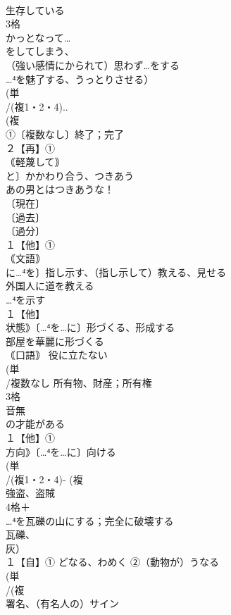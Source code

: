 \documentclass[8pt]{extreport}
\begin{document}
\begin{CJK}{UTF8}{min}
\\	生存している
\\	3格 
\\	かっとなって…
\\	をしてしまう、
\\	（強い感情にかられて）思わず…をする 
\\	…⁴を魅了する、うっとりさせる）
\\	(単
\\	/(複1・2・4)..
\\	(複
\\	①〔複数なし〕終了；完了 
\\	２【再】①
\\	｟軽蔑して｠
\\	と〕かかわり合う、つきあう 
\\	あの男とはつきあうな！
\\	〔現在〕
\\	〔過去〕
\\	〔過分〕
\\	１【他】①
\\	｟文語｠
\\	に…⁴を〕指し示す、（指し示して）教える、見せる 
\\	外国人に道を教える 
\\	…⁴を示す
\\	１【他】
\\	状態》〔…⁴を…に〕形づくる、形成する 
\\	部屋を華麗に形づくる
\\	｟口語｠ 役に立たない
\\	(単
\\	/複数なし 所有物、財産；所有権 
\\	3格 
\\	音無	
\\	の才能がある
\\	１【他】①
\\	方向》〔…⁴を…に〕向ける 
\\	(単
\\	/(複1・2・4)- (複
\\	強盗、盗賊 
\\	4格＋
\\	…⁴を瓦礫の山にする；完全に破壊する 
\\	瓦礫、
\\	灰）
\\	１【自】① どなる、わめく ②（動物が）うなる
\\	(単
\\	/(複
\\	署名、（有名人の）サイン 

\end{CJK}
\end{document}
